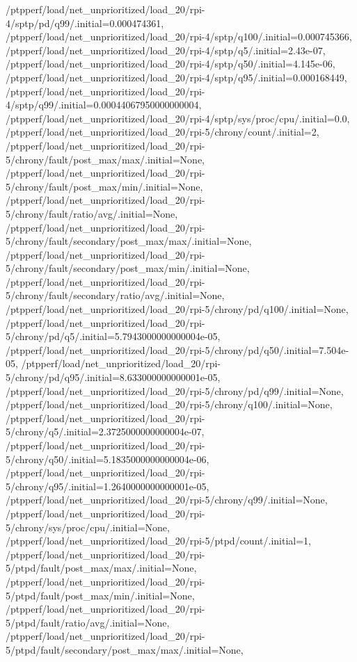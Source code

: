 {    /ptpperf/load/net_unprioritized/load_20/rpi-4/sptp/pd/q99/.initial=0.000474361,
    /ptpperf/load/net_unprioritized/load_20/rpi-4/sptp/q100/.initial=0.000745366,
    /ptpperf/load/net_unprioritized/load_20/rpi-4/sptp/q5/.initial=2.43e-07,
    /ptpperf/load/net_unprioritized/load_20/rpi-4/sptp/q50/.initial=4.145e-06,
    /ptpperf/load/net_unprioritized/load_20/rpi-4/sptp/q95/.initial=0.000168449,
    /ptpperf/load/net_unprioritized/load_20/rpi-4/sptp/q99/.initial=0.00044067950000000004,
    /ptpperf/load/net_unprioritized/load_20/rpi-4/sptp/sys/proc/cpu/.initial=0.0,
    /ptpperf/load/net_unprioritized/load_20/rpi-5/chrony/count/.initial=2,
    /ptpperf/load/net_unprioritized/load_20/rpi-5/chrony/fault/post_max/max/.initial=None,
    /ptpperf/load/net_unprioritized/load_20/rpi-5/chrony/fault/post_max/min/.initial=None,
    /ptpperf/load/net_unprioritized/load_20/rpi-5/chrony/fault/ratio/avg/.initial=None,
    /ptpperf/load/net_unprioritized/load_20/rpi-5/chrony/fault/secondary/post_max/max/.initial=None,
    /ptpperf/load/net_unprioritized/load_20/rpi-5/chrony/fault/secondary/post_max/min/.initial=None,
    /ptpperf/load/net_unprioritized/load_20/rpi-5/chrony/fault/secondary/ratio/avg/.initial=None,
    /ptpperf/load/net_unprioritized/load_20/rpi-5/chrony/pd/q100/.initial=None,
    /ptpperf/load/net_unprioritized/load_20/rpi-5/chrony/pd/q5/.initial=5.7943000000000004e-05,
    /ptpperf/load/net_unprioritized/load_20/rpi-5/chrony/pd/q50/.initial=7.504e-05,
    /ptpperf/load/net_unprioritized/load_20/rpi-5/chrony/pd/q95/.initial=8.633000000000001e-05,
    /ptpperf/load/net_unprioritized/load_20/rpi-5/chrony/pd/q99/.initial=None,
    /ptpperf/load/net_unprioritized/load_20/rpi-5/chrony/q100/.initial=None,
    /ptpperf/load/net_unprioritized/load_20/rpi-5/chrony/q5/.initial=2.3725000000000004e-07,
    /ptpperf/load/net_unprioritized/load_20/rpi-5/chrony/q50/.initial=5.1835000000000004e-06,
    /ptpperf/load/net_unprioritized/load_20/rpi-5/chrony/q95/.initial=1.2640000000000001e-05,
    /ptpperf/load/net_unprioritized/load_20/rpi-5/chrony/q99/.initial=None,
    /ptpperf/load/net_unprioritized/load_20/rpi-5/chrony/sys/proc/cpu/.initial=None,
    /ptpperf/load/net_unprioritized/load_20/rpi-5/ptpd/count/.initial=1,
    /ptpperf/load/net_unprioritized/load_20/rpi-5/ptpd/fault/post_max/max/.initial=None,
    /ptpperf/load/net_unprioritized/load_20/rpi-5/ptpd/fault/post_max/min/.initial=None,
    /ptpperf/load/net_unprioritized/load_20/rpi-5/ptpd/fault/ratio/avg/.initial=None,
    /ptpperf/load/net_unprioritized/load_20/rpi-5/ptpd/fault/secondary/post_max/max/.initial=None,
}
